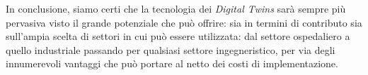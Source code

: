 In conclusione, siamo certi che la tecnologia dei \textit{Digital Twins} sarà sempre più pervasiva visto il grande potenziale che può offrire: sia in termini di contributo sia sull'ampia scelta di settori in cui può essere utilizzata: dal settore ospedaliero a quello industriale passando per qualsiasi settore ingegneristico, per via degli innumerevoli vantaggi che può portare al netto dei costi di implementazione.